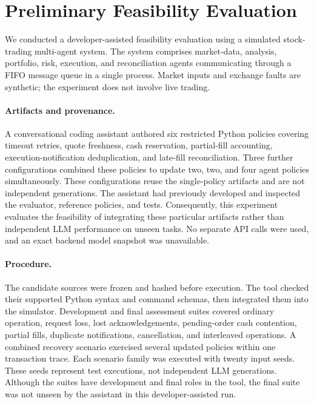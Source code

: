 \section{Preliminary Feasibility Evaluation}
\label{sec:preliminary}

We conducted a developer-assisted feasibility evaluation using a simulated
stock-trading multi-agent system. The system comprises market-data,
analysis, portfolio, risk, execution, and reconciliation agents communicating
through a FIFO message queue in a single process. Market inputs and exchange
faults are synthetic; the experiment does not involve live trading.

\paragraph{Artifacts and provenance.}
A conversational coding assistant authored six restricted Python policies
covering timeout retries, quote freshness, cash reservation, partial-fill
accounting, execution-notification deduplication, and late-fill reconciliation.
Three further configurations combined these policies to update two, two,
and four agent policies simultaneously. These configurations reuse the
single-policy artifacts and are not independent generations. The assistant
had previously developed and inspected the evaluator, reference policies,
and tests. Consequently, this experiment evaluates the feasibility of
integrating these particular artifacts rather than independent LLM
performance on unseen tasks. No separate API calls were used, and an exact
backend model snapshot was unavailable.

\paragraph{Procedure.}
The candidate sources were frozen and hashed before execution. The tool
checked their supported Python syntax and command schemas, then integrated
them into the simulator. Development and final assessment suites covered
ordinary operation, request loss, lost acknowledgements, pending-order cash
contention, partial fills, duplicate notifications, cancellation, and
interleaved operations. A combined recovery scenario exercised several
updated policies within one transaction trace. Each scenario family was
executed with twenty input seeds. These seeds represent test executions,
not independent LLM generations. Although the suites have development and
final roles in the tool, the final suite was not unseen by the assistant
in this developer-assisted run.

